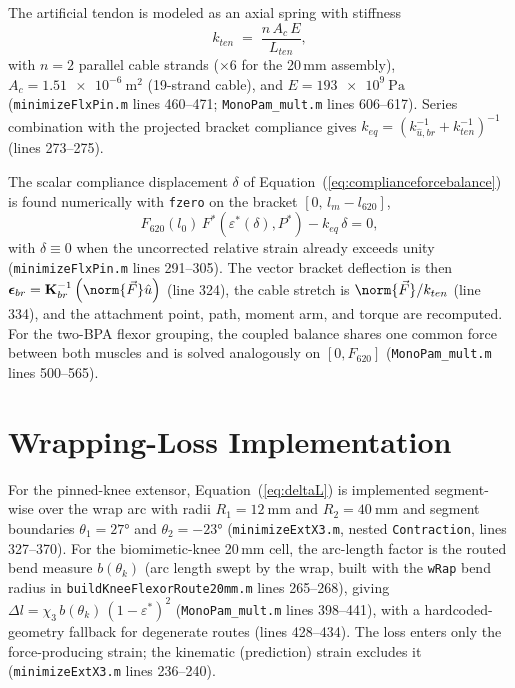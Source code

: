 The artificial tendon is modeled as an axial spring with stiffness
\begin{equation}
    k_{ten} \;=\; \frac{n\,A_{c}\,E}{L_{ten}},
    \label{eq:app_tendon}
\end{equation}
with $n=2$ parallel cable strands ($\times 6$ for the 20\,mm assembly),
$A_{c} = \qty{1.51e-6}{\metre\squared}$ (19-strand cable), and
$E = \qty{193e9}{\pascal}$
(\texttt{minimizeFlxPin.m} lines 460--471; \texttt{MonoPam\_mult.m} lines 606--617).
Series combination with the projected bracket compliance gives
$k_{eq} = \left(k_{\hat{u},br}^{-1} + k_{ten}^{-1}\right)^{-1}$
(lines 273--275).

The scalar compliance displacement $\delta$ of Equation~(\ref{eq:complianceforcebalance})
is found numerically with \texttt{fzero} on the bracket $[0,\, l_{m}-l_{620}]$,
\begin{equation}
    F_{620}(l_{0})\,F^{*}\!\left(\varepsilon^{*}(\delta),P^{*}\right) - k_{eq}\,\delta = 0,
    \label{eq:app_forcebalance}
\end{equation}
with $\delta \equiv 0$ when the uncorrected relative strain already exceeds unity
(\texttt{minimizeFlxPin.m} lines 291--305). The vector bracket deflection is then
$\boldsymbol{\epsilon}_{br} = \mathbf{K}_{br}^{-1}\left(\norm{\vec{F}}\hat{u}\right)$
(line 324), the cable stretch is $\norm{\vec{F}}/k_{ten}$ (line 334), and the
attachment point, path, moment arm, and torque are recomputed. For the two-BPA
flexor grouping, the coupled balance shares one common force between both muscles
and is solved analogously on $[0, F_{620}]$ (\texttt{MonoPam\_mult.m} lines
500--565).

\section{Wrapping-Loss Implementation}

For the pinned-knee extensor, Equation~(\ref{eq:deltaL}) is implemented
segment-wise over the wrap arc with radii $R_1 = \qty{12}{\mm}$ and
$R_2 = \qty{40}{\mm}$ and segment boundaries $\theta_{1} = \ang{27}$ and
$\theta_{2} = \ang{-23}$ (\texttt{minimizeExtX3.m}, nested \texttt{Contraction},
lines 327--370). For the biomimetic-knee 20\,mm cell, the arc-length factor is the
routed bend measure $b(\theta_{k})$ (arc length swept by the wrap, built with the
\texttt{wRap} bend radius in \texttt{buildKneeFlexorRoute20mm.m} lines 265--268),
giving $\Delta l = \chi_{3}\, b(\theta_{k})\,(1-\varepsilon^{*})^{2}$
(\texttt{MonoPam\_mult.m} lines 398--441), with a hardcoded-geometry fallback for
degenerate routes (lines 428--434). The loss enters only the force-producing
strain; the kinematic (prediction) strain excludes it
(\texttt{minimizeExtX3.m} lines 236--240).
